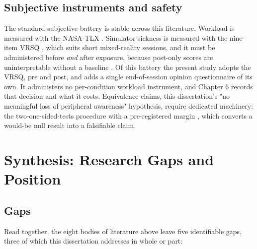 \subsection{Subjective instruments and safety}

The standard subjective battery is stable across this literature. Workload is measured with the
NASA-TLX \citep{hart1988}. Simulator sickness is measured with the nine-item VRSQ \citep{kim2018}, which suits short mixed-reality sessions, and it must be administered before \textit{and}
after exposure, because post-only scores are uninterpretable without a baseline \citep{brown2022}.
Of this battery the present study adopts the VRSQ, pre and post, and adds a single end-of-session
opinion questionnaire of its own. It administers no per-condition workload instrument, and Chapter 6
records that decision and what it costs. Equivalence claims, this dissertation's "no meaningful loss
of peripheral awareness" hypothesis, require dedicated machinery: the two-one-sided-tests procedure
with a pre-registered margin \citep{lakens2017}, which converts a would-be null result into a falsifiable
claim.

\section{Synthesis: Research Gaps and Position}

\subsection{Gaps}

Read together, the eight bodies of literature above leave five identifiable gaps, three of which this
dissertation addresses in whole or part:

